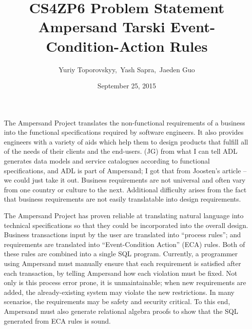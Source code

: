 \documentclass[12pt]{article}
\begin{document}
\title{CS4ZP6 Problem Statement \\ Ampersand Tarski Event-Condition-Action Rules } 
\author{Yuriy Toporovskyy,\ Yash Sapra,\ Jaeden Guo}
\date{September 25, 2015}
\thispagestyle{empty}
\maketitle
{}


The Ampersand Project translates the non-functional requirements of a
business into the functional specifications required by software engineers. It
also provides engineers with a variety of aids which help them to design
products that fulfill all of the needs of their clients and the end-users.
\edcomm(JG){ from what I can tell ADL generates data models and service 
catalogues according to functional specifications, and ADL is part of 
Ampersand; I got that from Joosten's article -- we could just take it out.}
Business requirements are not universal and often vary from one country or
culture to the next. Additional difficulty arises from the fact that business
requirements are not easily translatable into design requirements.

The Ampersand Project has proven reliable at translating natural
language into technical specifications so that they could be incorporated into
the overall design. Business transactions input by the user are translated into
``process rules''; and requirements are translated into ``Event-Condition
Action'' (ECA) rules. Both of these rules are combined into a single SQL
program. Currently, a programmer using Ampersand must manually ensure that each
requirement is satisfied after each transaction, by telling Ampersand how each
violation must be fixed. Not only is this process error prone, it is
unmaintainable; when new requirements are added, the already-existing system may
violate the new restrictions. In many scenarios, the requirements may be safety
and security critical. To this end, Ampersand must also generate relational
algebra proofs to show that the SQL generated from ECA rules is sound. 
\end{document}
